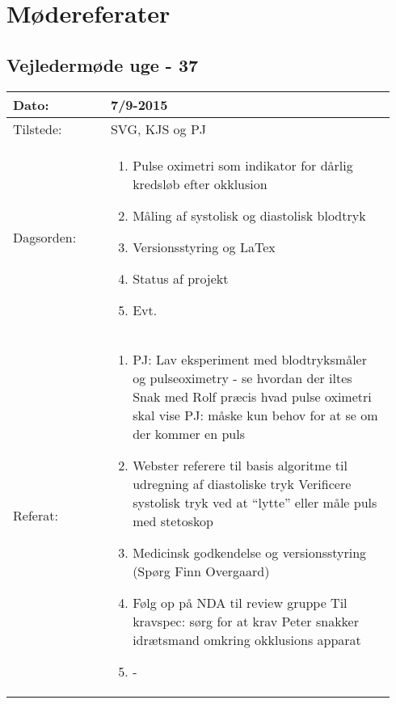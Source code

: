 \section{Mødereferater} \label{app:referater}
	\subsection{Vejledermøde uge - 37} \label{app:vejlderuge37}
	\begin{longtable}{|p{0.24\linewidth}|p{0.7\linewidth}|}
		\hline
		Dato: & 7/9-2015\\ \hline
		Tilstede: & SVG, KJS og PJ \\ \hline
		Dagsorden: &
		\begin{enumerate}
			\item Pulse oximetri som indikator for dårlig kredsløb efter okklusion
			\item Måling af systolisk og diastolisk blodtryk 
			\item Versionsstyring og LaTex
			\item Status af projekt
			\item Evt.
		\end{enumerate}
		\\ \hline
		Referat: & 
		\begin{enumerate}
			\item PJ:  Lav eksperiment med blodtryksmåler og pulseoximetry - se hvordan der iltes 
			Snak med Rolf præcis hvad pulse oximetri skal vise
			PJ: måske kun behov for at se om der kommer en puls
			\item Webster referere til basis algoritme til udregning af diastoliske tryk
			Verificere systolisk tryk ved at “lytte” eller måle puls med stetoskop 
			\item Medicinsk godkendelse og versionsstyring (Spørg Finn Overgaard)
			\item Følg op på NDA til review gruppe 
			Til kravspec: sørg for at krav
			Peter snakker idrætsmand omkring okklusions apparat
			\item -
		\end{enumerate}
		\\ \hline
	\end{longtable}
	
